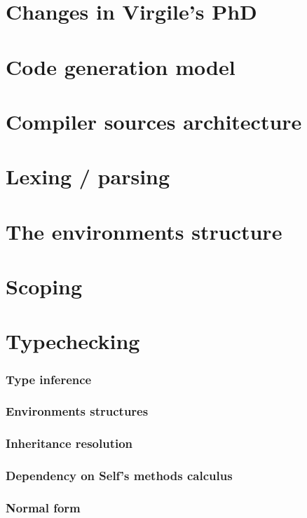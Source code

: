 \documentclass{book}
\begin{document}
\chapter{Changes in Virgile's PhD}


\chapter{Code generation model}


\chapter{Compiler sources architecture}


\chapter{Lexing / parsing}


\chapter{The environments structure}


\chapter{Scoping}


\chapter{Typechecking}
\subsection{Type inference}
\subsection{Environments structures}
\subsection{Inheritance resolution}
\subsection{Dependency on Self's methods calculus}
\subsection{Normal form}
\end{document}
